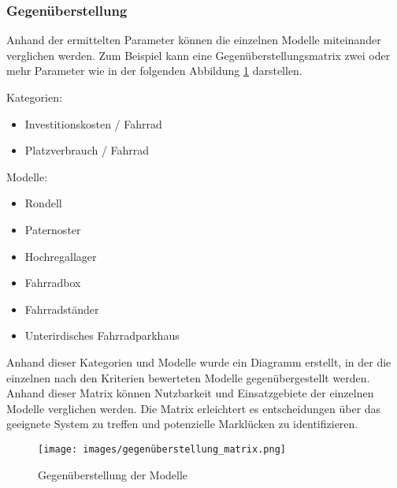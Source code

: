\subsubsection{Gegenüberstellung}

Anhand der ermittelten Parameter können die einzelnen Modelle miteinander verglichen werden. Zum Beispiel kann eine Gegenüberstellungsmatrix zwei oder mehr Parameter wie in der folgenden Abbildung \ref{fig:gegenueberstellung} darstellen.

Kategorien:
\begin{itemize}
  \item Investitionskosten / Fahrrad
  \item Platzverbrauch / Fahrrad
\end{itemize}

Modelle:
\begin{itemize}
  \item Rondell
  \item Paternoster
  \item Hochregallager
  \item Fahrradbox
  \item Fahrradständer
  \item Unterirdisches Fahrradparkhaus
\end{itemize}

Anhand dieser Kategorien und Modelle wurde ein Diagramm erstellt, in der die einzelnen nach den Kriterien bewerteten Modelle gegenübergestellt werden. Anhand dieser Matrix können Nutzbarkeit und Einsatzgebiete der einzelnen Modelle verglichen werden. Die Matrix erleichtert es entscheidungen über das geeignete System zu treffen und potenzielle Marklücken zu identifizieren.

\begin{figure}[H]
  \centering
  \texttt{[image: images/gegenüberstellung\_matrix.png]}
  \caption{Gegenüberstellung der Modelle}
  \label{fig:gegenueberstellung}
\end{figure}
